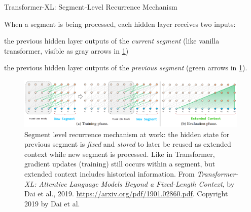 \begin{frame}{Transformer-XL: Segment-Level Recurrence Mechanism}

    \vspace{20pt}
    
    When a segment is being processed, each hidden layer receives two inputs: 
    
    \begin{itemizeSpaced}{5pt}
        \item the previous hidden layer outputs of the \emph{current segment} (like vanilla transformer, visible as gray arrows in \cref{fig:transXL_extendedContext})
        
        \item the previous hidden layer outputs of the \emph{previous segment} (green arrows in \cref{fig:transXL_extendedContext}).
    \end{itemizeSpaced}
    
    
    
    \begin{figure}[h]
    \vspace{-5pt}
    \centering
    \includegraphics[width=0.99\textwidth]{imgs/transXL_extendedcontext.png}
    \caption{ Segment level recurrence mechanism at work: the hidden state for previous segment is \emph{fixed} and \emph{stored} to later be reused as extended context while new segment is processed. Like in Transformer, gradient updates (training) still occurs within a segment, but extended context includes historical information. From \emph{Transformer-XL: Attentive Language Models Beyond a Fixed-Length Context}, by Dai et al., 2019. \url{https://arxiv.org/pdf/1901.02860.pdf}. Copyright 2019 by Dai et al.}
    \label{fig:transXL_extendedContext}
    \end{figure}
    
\end{frame}


